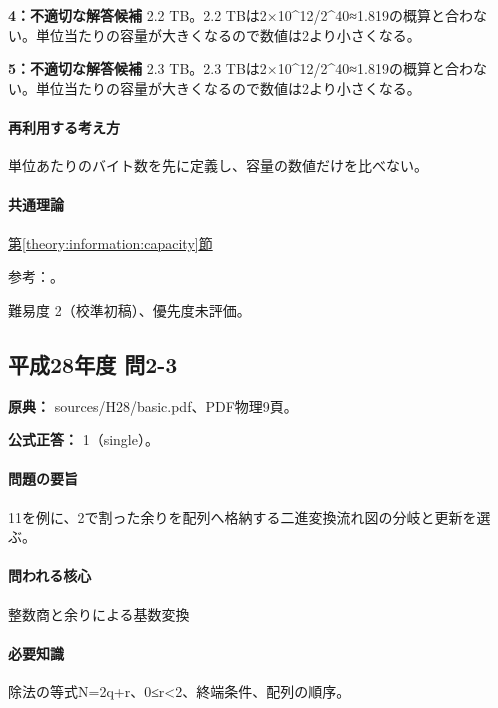 \noindent\textbf{4：不適切な解答候補} 2.2 TB。2.2 TBは2×10\textasciicircum{}12/2\textasciicircum{}40≈1.819の概算と合わない。単位当たりの容量が大きくなるので数値は2より小さくなる。\par

\noindent\textbf{5：不適切な解答候補} 2.3 TB。2.3 TBは2×10\textasciicircum{}12/2\textasciicircum{}40≈1.819の概算と合わない。単位当たりの容量が大きくなるので数値は2より小さくなる。\par

\paragraph{再利用する考え方} 単位あたりのバイト数を先に定義し、容量の数値だけを比べない。

\paragraph{共通理論} \hyperref[theory:information:capacity]{第\ref*{theory:information:capacity}節}

\par 参考：\cite{nist_binary_prefix}。

\par 難易度 2（校準初稿）、優先度未評価。

\subsection{平成28年度 問2-3}
\label{q:h28-reg-basic-2-3}

\noindent\textbf{原典：} sources/H28/basic.pdf、PDF物理9頁。

\textbf{公式正答：} 1（single）。

\paragraph{問題の要旨} 11を例に、2で割った余りを配列へ格納する二進変換流れ図の分岐と更新を選ぶ。

\paragraph{問われる核心} 整数商と余りによる基数変換

\paragraph{必要知識} 除法の等式N=2q+r、0≤r<2、終端条件、配列の順序。

